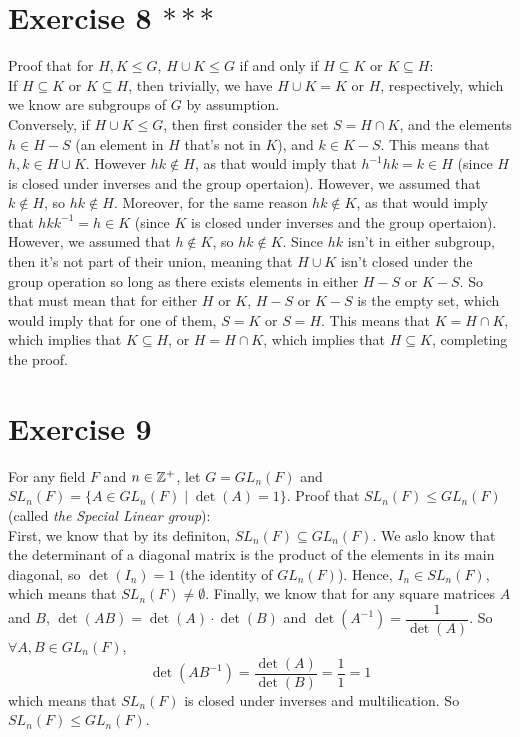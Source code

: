 \documentclass[12pt]{article}
\begin{document}
    \section*{Exercise 8 $***$}
    Proof that for $H, K \leqslant G$,
    $H \cup K \leqslant G$
    if and only if $H \subseteq K$ or  $K \subseteq H$: \\
    If $H \subseteq K$ or $K \subseteq H$,
    then trivially, we have $H \cup K = K$ or $H$, respectively,
    which we know are subgroups of $G$ by assumption. \\
    Conversely, if $H \cup K \leqslant G$,
    then first consider the set $S = H \cap K$,
    and the elements $h \in H - S$
    (an element in $H$ that's not in $K$),
    and $k \in K - S$.
    This means that $h, k \in H \cup K$.
    However $hk \notin H$,
    as that would imply that $h^{-1}hk = k \in H$
    (since $H$ is closed under inverses and the group opertaion).
    However, we assumed that $k \notin H$,
    so $hk \notin H$.
    Moreover, for the same reason $hk \notin K$,
    as that would imply that $hkk^{-1} = h \in K$
    (since $K$ is closed under inverses and the group opertaion).
    However, we assumed that $h \notin K$,
    so $hk \notin K$.
    Since $hk$ isn't in either subgroup,
    then it's not part of their union, meaning that $H \cup K$
    isn't closed under the group operation so long as
    there exists elements in either $H - S$ or $K - S$.
    So that must mean that for either $H$ or $K$,
    $H - S$ or $K - S$ is the empty set,
    which would imply that for one of them, $S = K$ or $S = H$.
    This means that $K = H \cap K$,
    which implies that $K \subseteq H$,
    or $H = H \cap K$,
    which implies that $H \subseteq K$,
    completing the proof.


    \section*{Exercise 9}
    For any field $F$ and $n \in \mathbb{Z}^+$,
    let $G = GL_n(F)$ and $SL_n(F) = \{A \in GL_n(F) \mid \det(A) = 1\}$.
    Proof that $SL_n(F) \leqslant GL_n(F)$
    (called \textit{the Special Linear group}): \\
    First, we know that by its definiton, $SL_n(F) \subseteq GL_n(F)$.
    We aslo know that the determinant of a diagonal matrix is the product
    of the elements in its main diagonal,
    so $\det(I_n) = 1$ (the identity of $GL_n(F)$).
    Hence, $I_n \in SL_n(F)$,
    which means that $SL_n(F) \neq \emptyset$.
    Finally, we know that for any square matrices $A$ and $B$,
    $\det(AB) = \det(A) \cdot \det(B)$
    and $\det(A^{-1}) = \dfrac{1}{\det(A)}$.
    So $\forall A, B \in GL_n(F)$,
    \[\det(AB^{-1}) = \dfrac{\det(A)}{\det(B)} = \dfrac{1}{1} = 1\]
    which means that $SL_n(F)$ is closed under inverses and multilication.
    So $SL_n(F) \leqslant GL_n(F)$.
\end{document}
